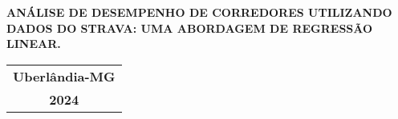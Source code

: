 \documentclass[12pt,openright]{report}
\begin{document}


\begin{titlepage}
    \bfseries\LARGE
    \centering
    \vspace*{3cm} %
    {ANÁLISE DE DESEMPENHO DE CORREDORES UTILIZANDO DADOS DO STRAVA: UMA ABORDAGEM DE REGRESSÃO LINEAR.}
    \vspace{2cm} %
    \vfill
    \begin{center}
    \begin{large}
    \begin{tabular}{c}
    \Large{\bfseries Uberlândia-MG}\\[0.25cm]
    \Large{\bfseries 2024}\\
    \end{tabular}
    \end{large}
    \end{center}
\end{titlepage}
\end{document}
